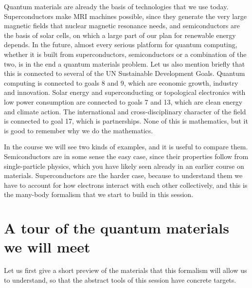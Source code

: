 Quantum materials are already the basis of technologies that we use today. Superconductors make MRI machines possible, since they generate the
very large magnetic fields that nuclear magnetic resonance needs, and semiconductors are the basis
of solar cells, on which a large part of our plan for renewable energy depends. In the future,
almost every serious platform for quantum computing, whether it is built from superconductors,
semiconductors or a combination of the two, is in the end a quantum materials problem. Let us also
mention briefly that this is connected to several of the UN Sustainable Development Goals. Quantum
computing is connected to goals 8 and 9, which are economic growth, industry and innovation. Solar
energy and superconducting or topological electronics with low power consumption are connected to
goals 7 and 13, which are clean energy and climate action. The international and
cross-disciplinary character of the field is connected to goal 17, which is partnerships. None of
this is mathematics, but it is good to remember why we do the mathematics.

In the course we will see two kinds of examples, and it is useful to compare them. Semiconductors
are in some sense the easy case, since their properties follow from single-particle physics, which
you have likely seen already in an earlier course on materials. Superconductors are the harder
case, because to understand them we have to account for how electrons interact with each other
collectively, and this is the many-body formalism that we start to build in this session.

\section{A tour of the quantum materials we will meet}

Let us first give a short preview of the materials that this formalism will allow us to understand,
so that the abstract tools of this session have concrete targets.

